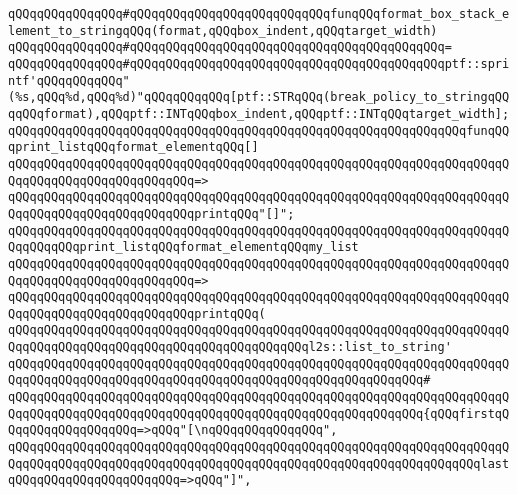 \newline
\newline
\verb|qQQqqQQqqQQqqQQq#qQQqqQQqqQQqqQQqqQQqqQQqqQQqfunqQQqformat_box_stack_element_to_stringqQQq(format,qQQqbox_indent,qQQqtarget_width)|\newline
\verb|qQQqqQQqqQQqqQQq#qQQqqQQqqQQqqQQqqQQqqQQqqQQqqQQqqQQqqQQqqQQq=|\newline
\verb|qQQqqQQqqQQqqQQq#qQQqqQQqqQQqqQQqqQQqqQQqqQQqqQQqqQQqqQQqqQQqptf::sprintf'qQQqqQQqqQQq"(%s,qQQq%d,qQQq%d)"qQQqqQQqqQQq[ptf::STRqQQq(break_policy_to_stringqQQqqQQqformat),qQQqptf::INTqQQqbox_indent,qQQqptf::INTqQQqtarget_width];|\newline
\newline
\newline
\verb|qQQqqQQqqQQqqQQqqQQqqQQqqQQqqQQqqQQqqQQqqQQqqQQqqQQqqQQqqQQqqQQqfunqQQqprint_listqQQqformat_elementqQQq[]|\newline
\verb|qQQqqQQqqQQqqQQqqQQqqQQqqQQqqQQqqQQqqQQqqQQqqQQqqQQqqQQqqQQqqQQqqQQqqQQqqQQqqQQqqQQqqQQqqQQqqQQq=>|\newline
\verb|qQQqqQQqqQQqqQQqqQQqqQQqqQQqqQQqqQQqqQQqqQQqqQQqqQQqqQQqqQQqqQQqqQQqqQQqqQQqqQQqqQQqqQQqqQQqqQQqprintqQQq"[]";|\newline
\newline
\verb|qQQqqQQqqQQqqQQqqQQqqQQqqQQqqQQqqQQqqQQqqQQqqQQqqQQqqQQqqQQqqQQqqQQqqQQqqQQqqQQqprint_listqQQqformat_elementqQQqmy_list|\newline
\verb|qQQqqQQqqQQqqQQqqQQqqQQqqQQqqQQqqQQqqQQqqQQqqQQqqQQqqQQqqQQqqQQqqQQqqQQqqQQqqQQqqQQqqQQqqQQqqQQq=>|\newline
\verb|qQQqqQQqqQQqqQQqqQQqqQQqqQQqqQQqqQQqqQQqqQQqqQQqqQQqqQQqqQQqqQQqqQQqqQQqqQQqqQQqqQQqqQQqqQQqqQQqprintqQQq(|\newline
\verb|qQQqqQQqqQQqqQQqqQQqqQQqqQQqqQQqqQQqqQQqqQQqqQQqqQQqqQQqqQQqqQQqqQQqqQQqqQQqqQQqqQQqqQQqqQQqqQQqqQQqqQQqqQQqqQQql2s::list_to_string'|\newline
\verb|qQQqqQQqqQQqqQQqqQQqqQQqqQQqqQQqqQQqqQQqqQQqqQQqqQQqqQQqqQQqqQQqqQQqqQQqqQQqqQQqqQQqqQQqqQQqqQQqqQQqqQQqqQQqqQQqqQQqqQQqqQQqqQQq#|\newline
\verb|qQQqqQQqqQQqqQQqqQQqqQQqqQQqqQQqqQQqqQQqqQQqqQQqqQQqqQQqqQQqqQQqqQQqqQQqqQQqqQQqqQQqqQQqqQQqqQQqqQQqqQQqqQQqqQQqqQQqqQQqqQQqqQQq{qQQqfirstqQQqqQQqqQQqqQQqqQQq=>qQQq"[\nqQQqqQQqqQQqqQQq",|\newline
\verb|qQQqqQQqqQQqqQQqqQQqqQQqqQQqqQQqqQQqqQQqqQQqqQQqqQQqqQQqqQQqqQQqqQQqqQQqqQQqqQQqqQQqqQQqqQQqqQQqqQQqqQQqqQQqqQQqqQQqqQQqqQQqqQQqqQQqqQQqlastqQQqqQQqqQQqqQQqqQQqqQQq=>qQQq"]",|\newline
